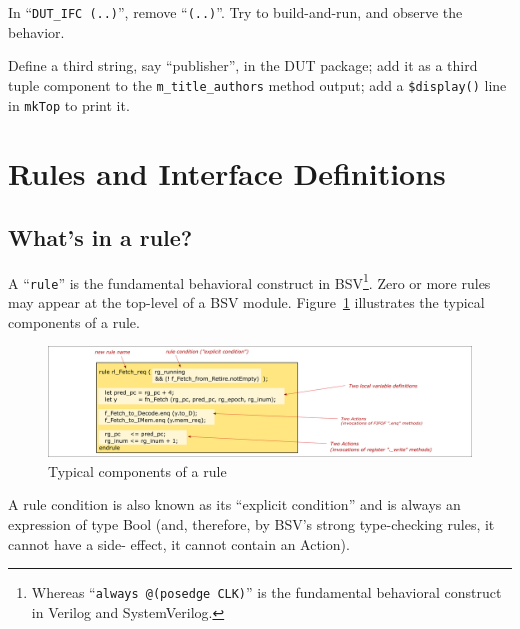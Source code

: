 \Exercise

In ``\verb|DUT_IFC (..)|'', remove ``\verb|(..)|''.  Try to
build-and-run, and observe the behavior.

\Exercise

Define a third string, say ``publisher'', in the DUT package; add it
as a third tuple component to the \verb|m_title_authors| method
output; add a \verb|$display()| line in \verb|mkTop| to print it.

\Endexercise


\section{Rules and Interface Definitions}

\label{Sec_Rules_and_Interface_Defs}


\subsection{What's in a rule?}


A ``\verb|rule|'' is the fundamental behavioral construct in
BSV\footnote{Whereas ``{\tt always @(posedge CLK)}'' is the
fundamental behavioral construct in Verilog and SystemVerilog.}. Zero
or more rules may appear at the top-level of a BSV module.
Figure~\ref{Fig_BSV_whats_in_a_rule} illustrates the typical
components of a rule.

\begin{figure}[htbp]
  \centerline{\includegraphics[width=6in,angle=0]{Figures/Fig_BSV_whats_in_a_rule}}
  \caption{\label{Fig_BSV_whats_in_a_rule}
           Typical components of a rule}
\end{figure}

A rule condition is also known as its ``explicit condition'' and is
always an expression of type Bool (and, therefore, by BSV's strong
type-checking rules, it cannot have a side- effect, {\ie} it cannot
contain an Action).

